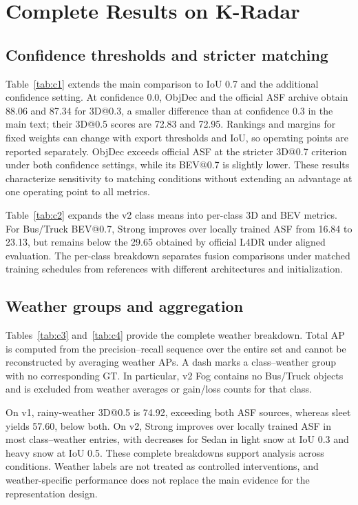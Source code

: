 \section{Complete Results on K-Radar}
\label{app:c}

\subsection{Confidence thresholds and stricter matching}
\label{subsec:c1}

Table~\ref{tab:c1} extends the main comparison to IoU 0.7 and the additional confidence setting. At confidence 0.0, ObjDec and the official ASF archive obtain 88.06 and 87.34 for 3D@0.3, a smaller difference than at confidence 0.3 in the main text; their 3D@0.5 scores are 72.83 and 72.95. Rankings and margins for fixed weights can change with export thresholds and IoU, so operating points are reported separately. ObjDec exceeds official ASF at the stricter 3D@0.7 criterion under both confidence settings, while its BEV@0.7 is slightly lower. These results characterize sensitivity to matching conditions without extending an advantage at one operating point to all metrics.

Table~\ref{tab:c2} expands the v2 class means into per-class 3D and BEV metrics. For Bus/Truck BEV@0.7, Strong improves over locally trained ASF from 16.84 to 23.13, but remains below the 29.65 obtained by official L4DR under aligned evaluation. The per-class breakdown separates fusion comparisons under matched training schedules from references with different architectures and initialization.

\subsection{Weather groups and aggregation}
\label{subsec:c2}

Tables~\ref{tab:c3} and~\ref{tab:c4} provide the complete weather breakdown. Total AP is computed from the precision--recall sequence over the entire set and cannot be reconstructed by averaging weather APs. A dash marks a class--weather group with no corresponding GT. In particular, v2 Fog contains no Bus/Truck objects and is excluded from weather averages or gain/loss counts for that class.

On v1, rainy-weather 3D@0.5 is 74.92, exceeding both ASF sources, whereas sleet yields 57.60, below both. On v2, Strong improves over locally trained ASF in most class--weather entries, with decreases for Sedan in light snow at IoU 0.3 and heavy snow at IoU 0.5. These complete breakdowns support analysis across conditions. Weather labels are not treated as controlled interventions, and weather-specific performance does not replace the main evidence for the representation design.









